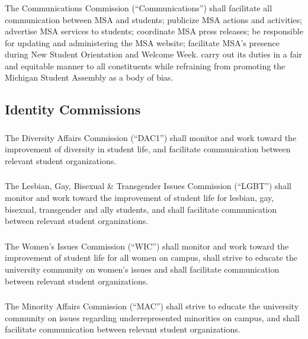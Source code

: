 \subsubsection{}
The Communications Commission (``Communications'') shall
\subsubsubsection{}
facilitate all communication between MSA and students;
\subsubsubsection{}
publicize MSA actions and activities;
\subsubsubsection{}
advertise MSA services to students;
\subsubsubsection{}
coordinate MSA press releases;
\subsubsubsection{}
be responsible for updating and administering the MSA website;
\subsubsubsection{}
facilitate MSA's presence during New Student Orientation and Welcome Week.
\subsubsubsection{}
carry out its duties in a fair and equitable manner to all constituents while refraining from promoting the Michigan Student Assembly as a body of bias.


\subsection{Identity Commissions}

\subsubsection{}
The Diversity Affairs Commission (``DAC1'') shall monitor and work toward the improvement of diversity in student life, and facilitate communication between relevant student organizations.

\subsubsection{}
The Lesbian, Gay, Bisexual \& Transgender Issues Commission (``LGBT'') shall monitor and work toward the improvement of student life for lesbian, gay, bisexual, transgender and ally students, and shall facilitate communication between relevant student organizations.

\subsubsection{}
The Women's Issues Commission (``WIC'') shall monitor and work toward the improvement of student life for all women on campus, shall strive to educate the university community on women's issues and shall facilitate communication between relevant student organizations.

\subsubsection{}
The Minority Affairs Commission (``MAC'') shall strive to educate the university community on issues regarding underrepresented minorities on campus, and shall facilitate communication between relevant student organizations.

